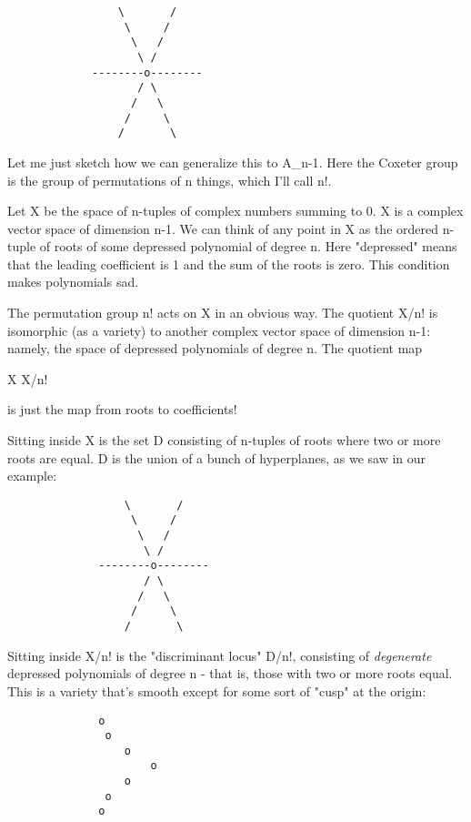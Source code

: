                          
\begin{verbatim}
                 \       /
                  \     /
                   \   /
                    \ /
             --------o--------
                    / \
                   /   \
                  /     \
                 /       \
\end{verbatim}
    
Let me just sketch how we can generalize this to A_{n-1}.   Here 
the Coxeter group is the group of permutations of n things, which
I'll call n!.

Let X be the space of n-tuples of complex numbers summing to 0.  
X is a complex vector space of dimension n-1.  We can think of
any point in X as the ordered n-tuple of roots of some depressed polynomial
of degree n.  Here "depressed" means that the leading coefficient 
is 1 and the sum of the roots is zero.  This condition makes polynomials
sad.

The permutation group n! acts on X in an obvious way.  The 
quotient X/n! is isomorphic (as a variety) to another complex 
vector space of dimension n-1: namely, the space of depressed 
polynomials of degree n.  The quotient map

X \to  X/n!

is just the map from roots to coefficients!  

Sitting inside X is the set D consisting of n-tuples of roots
where two or more roots are equal.  D is the union of a bunch of hyperplanes,
as we saw in our example:

                         
\begin{verbatim}
                  \       /
                   \     /
                    \   /
                     \ /
              --------o--------
                     / \
                    /   \
                   /     \
                  /       \
\end{verbatim}
    
Sitting inside X/n! is the "discriminant locus" D/n!, consisting
of \emph{degenerate} depressed polynomials of degree n - that is, those
with two or more roots equal.  This is a variety that's smooth except for 
some sort of "cusp" at the origin:

\begin{verbatim}
              o
               o
                  o
                      o
                  o
               o
              o
\end{verbatim}
    
